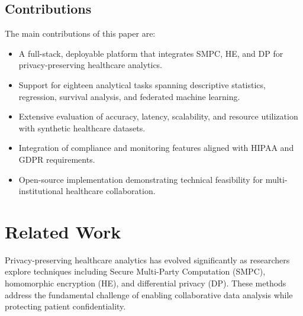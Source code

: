 \documentclass[conference]{IEEEtran}
\begin{document}
\subsection{Contributions}
The main contributions of this paper are:
\begin{itemize}
    \item A full-stack, deployable platform that integrates SMPC, HE, and DP for privacy-preserving healthcare analytics.
    \item Support for eighteen analytical tasks spanning descriptive statistics, regression, survival analysis, and federated machine learning.
    \item Extensive evaluation of accuracy, latency, scalability, and resource utilization with synthetic healthcare datasets.
    \item Integration of compliance and monitoring features aligned with HIPAA and GDPR requirements.
    \item Open-source implementation demonstrating technical feasibility for multi-institutional healthcare collaboration.
\end{itemize}

\section{Related Work}
Privacy-preserving healthcare analytics has evolved significantly as researchers explore techniques including Secure Multi-Party Computation (SMPC), homomorphic encryption (HE), and differential privacy (DP). These methods address the fundamental challenge of enabling collaborative data analysis while protecting patient confidentiality.
\end{document}
